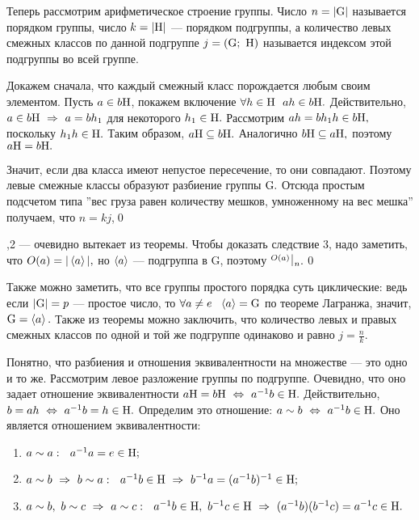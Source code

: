 Теперь рассмотрим арифметическое строение группы. Число $n=|{\rm G}|$ называется порядком группы, число $k=|{\rm H}|$ --- порядком
подгруппы, а количество левых смежных классов по данной подгруппе $j=({\rm G};\ {\rm H})$ называется индексом этой подгруппы во всей группе.

\dok Докажем сначала, что каждый смежный класс порождается любым своим элементом. Пусть $a\in b{\rm H}$, покажем включение $\forall h\in{\rm H}\ \  ah\in b{\rm H}.$
Действительно, $a\in b{\rm H}\ \Rightarrow\  a=bh_1$ для некоторого $h_1\in {\rm H}.$ Рассмотрим $ah=bh_1h\in b{\rm H},$ поскольку $h_1h\in{\rm H}.$
Таким образом, $a{\rm H}\subseteq b{\rm H}.$ Аналогично $b{\rm H}\subseteq a{\rm H},$ поэтому $a{\rm H}=b{\rm H}.$

Значит, если два класса имеют непустое пересечение, то они совпадают. Поэтому левые смежные классы образуют разбиение группы ${\rm G}.$
Отсюда простым подсчетом типа ''вес груза равен количеству мешков, умноженному на вес мешка'' получаем, что $n=kj$,\quad\qed
{}

,2 --- очевидно вытекает из теоремы. Чтобы доказать следствие 3, надо заметить, что $O(a)=|\left\langle a\right\rangle|,$ но $\left\langle a\right\rangle$ --- подгруппа
в \mr G, поэтому ${}^{O(a)}\,\vrule\,_n.$\quad\qed

Также можно заметить, что все группы простого порядка суть циклические: ведь если $|{\rm G}|=p$ --- простое число, то
$\forall a\ne e\ \ \left\langle a\right\rangle={\rm G}$ по теореме Лагранжа, значит, ${\rm G}=\left\langle a\right\rangle.$ Также из теоремы можно заключить, что
количество левых и правых смежных классов по одной и той же подгруппе одинаково и равно $j=\frac nk.$

Понятно, что разбиения и отношения эквивалентности на множестве --- это одно и то же. Рассмотрим левое разложение группы по подгруппе.
Очевидно, что оно задает отношение эквивалентности $a{\rm H}=b{\rm H}\ \Leftrightarrow\  a^{-1}b\in {\rm H}.$ Действительно, $b=ah\ \Leftrightarrow\  a^{-1}b=h\in {\rm H}.$
Определим это отношение: $a\sim b\ \Leftrightarrow\  a^{-1}b\in {\rm H}.$ Оно является отношением эквивалентности:
\begin{enumerate}
    \item $a\sim a:\ \ a^{-1}a=e\in {\rm H};$
    \item $a\sim b\ \Rightarrow\  b\sim a:\ \ a^{-1}b\in{\rm H}\ \Rightarrow\  b^{-1}a=(a^{-1}b)^{-1}\in{\rm H};$
    \item $a\sim b,\ b\sim c\ra a\sim c:\ \ a^{-1}b\in\rr H,\ b^{-1}c\in\rr H\ra (a^{-1}b)(b^{-1}c)=a^{-1}c\in\rr H.$
\end{enumerate}

